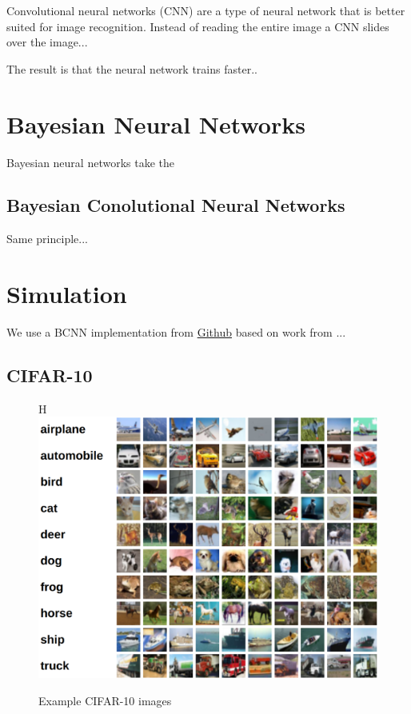 \documentclass[12pt]{article}
\begin{document}
Convolutional neural networks (CNN) are a type of neural network that is better suited for image recognition. Instead of reading the entire image a CNN slides over the image... 

The result is that the neural network trains faster..

\section{Bayesian Neural Networks}

Bayesian neural networks take the

\subsection{Bayesian Conolutional Neural Networks}

Same principle...

\section{Simulation}

We use a BCNN implementation from \href{https://github.com/kumar-shridhar/PyTorch-BayesianCNN}{Github} based on work from ... \cite{shridhar2019comprehensive} \cite{shridhar2018uncertainty}

\subsection{CIFAR-10}

	\begin{figure}H
		\centering
	\includegraphics[width=.75\textwidth]{../Images/cifar-10.png}
	\caption{Example CIFAR-10 images \cite{cifar10}}
\end{figure}
\end{document}
